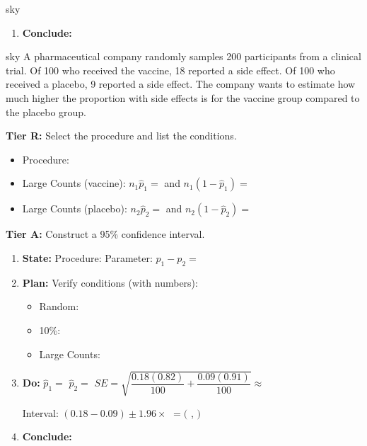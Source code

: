 \documentclass[10pt]{article}
\begin{document}
\begin{scenariobox}{sky}
\begin{enumerate}
        $t \approx$  \quad $df \approx$  (technology) \quad $p$-value $\approx$ 
  \item \textbf{Conclude:} 
\end{enumerate}
\end{scenariobox}

\begin{scenariobox}{sky}
A pharmaceutical company randomly samples 200 participants from a clinical trial.
Of 100 who received the vaccine, 18 reported a side effect. Of 100 who received a
placebo, 9 reported a side effect. The company wants to estimate how much higher the
proportion with side effects is for the vaccine group compared to the placebo group.

\textbf{Tier R:} Select the procedure and list the conditions.
\begin{itemize}
  \item Procedure: 
  \item Large Counts (vaccine): $n_1 \hat p_1 =$  and $n_1(1-\hat p_1) =$ 
  \item Large Counts (placebo): $n_2 \hat p_2 =$  and $n_2(1-\hat p_2) =$ 
\end{itemize}

\textbf{Tier A:} Construct a 95\% confidence interval.
\begin{enumerate}
  \item \textbf{State:} Procedure:  \quad
        Parameter: $p_1 - p_2 =$ 
  \item \textbf{Plan:} Verify conditions (with numbers):
        \begin{itemize}
          \item Random: 
          \item 10\%: 
          \item Large Counts: 
        \end{itemize}
  \item \textbf{Do:} $\hat p_1 =$  \; $\hat p_2 =$  \;
        $SE = \sqrt{\dfrac{0.18(0.82)}{100} + \dfrac{0.09(0.91)}{100}} \approx$ 

        Interval: $(0.18-0.09) \pm 1.96 \times$  $= ($ ,  $)$
  \item \textbf{Conclude:} 
\end{enumerate}
\end{scenariobox}
\end{document}
